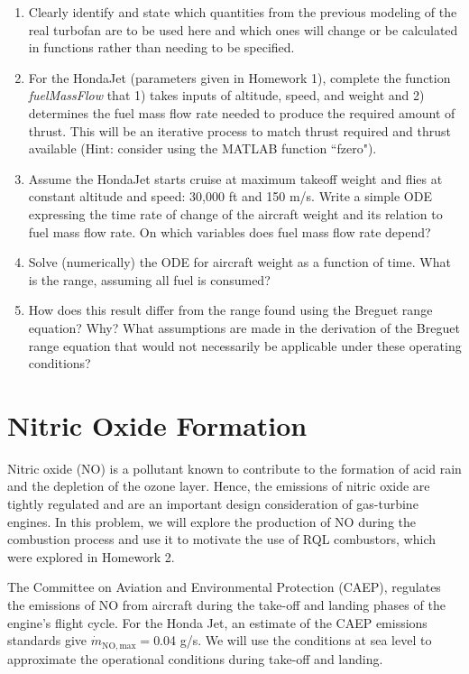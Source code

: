 \documentclass[11pt]{article}
\begin{document}
\begin{enumerate}[label=(\alph*)]
	\item 
		Clearly identify and state which quantities from the previous modeling of the real turbofan are to be used here and which ones will change or be calculated in functions rather than needing to be specified.
	\item 
		For the HondaJet (parameters given in Homework 1), complete the function \emph{fuelMassFlow} that 1) takes inputs of altitude, speed, and weight and 2) determines the fuel mass flow rate needed to produce the required amount of thrust. This will be an iterative process to match thrust required and thrust available (Hint: consider using the MATLAB function ``fzero").
	\item 
		Assume the HondaJet starts cruise at maximum takeoff weight and flies at constant altitude and speed: 30,000 ft and 150 m/s. Write a simple ODE expressing the time rate of change of the aircraft weight and its relation to fuel mass flow rate. On which variables does fuel mass flow rate depend?
	\item 
		Solve (numerically) the ODE for aircraft weight as a function of time. What is the range, assuming all fuel is consumed?
	\item 
		How does this result differ from the range found using the Breguet range equation? Why? What assumptions are made in the derivation of the Breguet range equation that would not necessarily be applicable under these operating conditions?		
\end{enumerate}
\section{Nitric Oxide Formation}
Nitric oxide (NO) is a pollutant known to contribute to the formation of acid rain and the depletion of the ozone layer. Hence, the emissions of nitric oxide are tightly regulated and are an important design consideration of gas-turbine engines. In this problem, we will explore the production of NO during the combustion process and use it to motivate the use of RQL combustors, which were explored in Homework 2.

The Committee on Aviation and Environmental Protection (CAEP), regulates the emissions of NO from aircraft during the take-off and landing phases of the engine's flight cycle. For the Honda Jet, an estimate of the CAEP emissions standards give $\dot{m}_\mathrm{NO,max}=$0.04 g/s. We will use the conditions at sea level to approximate the operational conditions during take-off and landing. 
\end{document}

